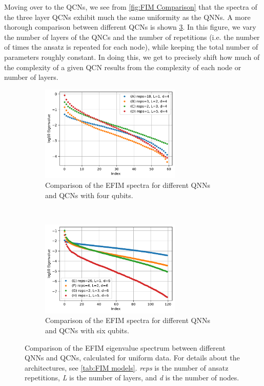 Moving over to the QCNs, we see from \cref{fig:FIM Comparison} that the spectra of the three layer QCNs exhibit much the same uniformity as the QNNs. A more thorough comparison between different QCNs is shown \cref{fig:FIM QCN}. In this figure, we vary the number of layers of the QNCs and the number of repetitions (i.e. the number of times the ansatz is repeated for each node), while keeping the total number of parameters roughly constant. In doing this, we get to precisely shift how much of the complexity of a given QCN results from the complexity of each node or number of layers.

\begin{figure}[H]
    \centering
    \begin{subfigure}[t]{0.45\textwidth}
        \centering
        \includegraphics[height=1.8in]{latex/figures/FIM_qubits_4_comparison.pdf}
        \caption{Comparison of the EFIM spectra for different QNNs and QCNs with four qubits.}
        \label{fig:FIM QCN a}
    \end{subfigure}%
    ~ 
    \begin{subfigure}[t]{0.45\textwidth}
        \centering
        \includegraphics[height=1.8in]{latex/figures/FIM_qubits_6_comparison.pdf}
        \caption{Comparison of the EFIM spectra for different QNNs and QCNs with six qubits.}
        \label{fig:FIM QCN b}
    \end{subfigure}
    \caption{Comparison of the EFIM eigenvalue spectrum between different QNNs and QCNs, calculated for uniform data. For details about the architectures, see \cref{tab:FIM models}. \emph{reps} is the number of ansatz repetitions, \emph{L} is the number of layers, and \emph{d} is the number of nodes.}
    \label{fig:FIM QCN}
\end{figure}

